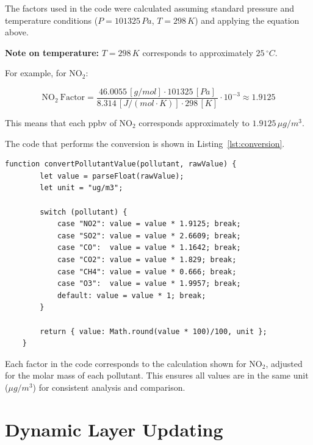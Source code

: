 The factors used in the code were calculated assuming standard pressure and temperature conditions (\(P = 101325\,Pa\), \(T = 298\,K\)) and applying the equation above.  

\textbf{Note on temperature:} \(T = 298\,K\) corresponds to approximately \(25\,^\circ C\).


For example, for \(\mathrm{NO_2}\):

\[
\mathrm{NO_2\ Factor} = \frac{46.0055\,[g/mol] \cdot 101325\,[Pa]}{8.314\,[J/(mol\cdot K)] \cdot 298\,[K]} \cdot 10^{-3} \approx 1.9125
\]

This means that each ppbv of NO\(_2\) corresponds approximately to \(1.9125\,\mu g/m^3\).  

The code that performs the conversion is shown in Listing~\ref{lst:conversion}.

\begin{lstlisting}[caption={Conversion of pollutant values to \(\mu g/m^3\)}, label={lst:conversion}]
	function convertPollutantValue(pollutant, rawValue) {
		let value = parseFloat(rawValue);
		let unit = "ug/m3"; 
		
		switch (pollutant) {
			case "NO2": value = value * 1.9125; break;
			case "SO2": value = value * 2.6609; break;
			case "CO":  value = value * 1.1642; break;
			case "CO2": value = value * 1.829; break;
			case "CH4": value = value * 0.666; break;
			case "O3":  value = value * 1.9957; break;
			default: value = value * 1; break;
		}
		
		return { value: Math.round(value * 100)/100, unit };
	}
\end{lstlisting}

Each factor in the code corresponds to the calculation shown for NO\(_2\), adjusted for the molar mass of each pollutant. This ensures all values are in the same unit (\(\mu g/m^3\)) for consistent analysis and comparison.

\section{Dynamic Layer Updating}

